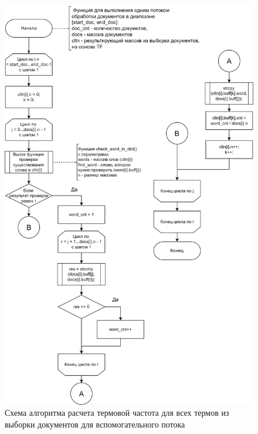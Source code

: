 \clearpage

\begin{figure}[h]
	\centering
	\includegraphics[height=0.85\textheight]{img/thread_work.png}
	\caption{Схема алгоритма расчета термовой частота для всех термов из выборки документов для вспомогательного потока}
	\label{fig:thread_work}
\end{figure}

\clearpage

